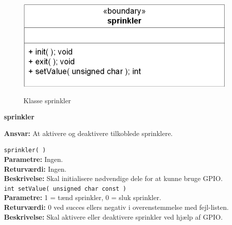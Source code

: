 \begin{figure}[htbp] \centering
{\includegraphics[scale=1.3]{filer/design/Klassediagrammer/sw_psoc_sprinkler}}
\caption{Klasse sprinkler}
\label{fig:sw_psoc_class_sprinkler}
\end{figure} 

{\centering
\textbf{sprinkler}\par
}
\textbf{Ansvar:} At aktivere og deaktivere tilkoblede sprinklere. \

\verb+sprinkler( )+ \\
\textbf{Parametre:} Ingen. \\
\textbf{Returværdi:} Ingen. \\
\textbf{Beskrivelse:} Skal initialisere nødvendige dele for at kunne bruge GPIO.\\

\verb+int setValue( unsigned char const )+ \\
\textbf{Parametre:} 1 = tænd sprinkler, 0 = sluk sprinkler. \\
\textbf{Returværdi:} 0 ved succes ellers negativ i overenstemmelse med fejl-listen. \\
\textbf{Beskrivelse:} Skal aktivere eller deaktivere sprinkler ved hjælp af GPIO.\\